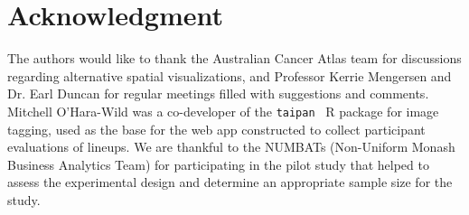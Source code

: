\documentclass[journal]{vgtc}                     %
\begin{document}




\hypertarget{acknowledgment}{%
\section{Acknowledgment}\label{acknowledgment}}

The authors would like to thank the Australian Cancer Atlas team for discussions regarding alternative spatial visualizations, and Professor Kerrie Mengersen and Dr. Earl Duncan for regular meetings filled with suggestions and comments. Mitchell O'Hara-Wild was a co-developer of the \texttt{taipan}~\cite{taipan} R package for image tagging, used as the base for the web app constructed to collect participant evaluations of lineups. We are thankful to the NUMBATs (Non-Uniform Monash Business Analytics Team) for participating in the pilot study that helped to assess the experimental design and determine an appropriate sample size for the study.
\end{document}
